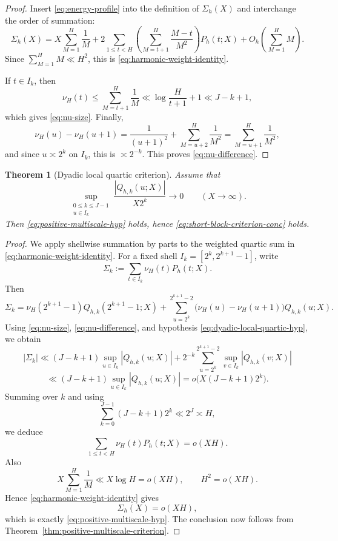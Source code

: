\documentclass[11pt]{scrartcl}
\numberwithin{equation}{section}
\newtheorem{theorem}{Theorem}[section]
\theoremstyle{definition}
\newcommand{\1}{\mathbf 1}
\newcommand{\abs}[1]{\left|#1\right|}
\begin{document}
\begin{proof}
Insert \eqref{eq:energy-profile} into the definition of $\Sigma_h(X)$ and interchange the order of summation:
\[
\Sigma_h(X)
=
X\sum_{M=1}^{H}\frac1M+2\sum_{1\le t<H}\left(\sum_{M=t+1}^{H}\frac{M-t}{M^2}\right)P_h(t;X)+O_h\!\left(\sum_{M=1}^{H}M\right).
\]
Since $\sum_{M=1}^{H}M\ll H^2$, this is \eqref{eq:harmonic-weight-identity}.

If $t\in I_k$, then
\[
\nu_H(t)\le \sum_{M=t+1}^{H}\frac1M \ll \log\!\frac{H}{t+1}+1\ll J-k+1,
\]
which gives \eqref{eq:nu-size}. Finally,
\[
\nu_H(u)-\nu_H(u+1)
=
\frac1{(u+1)^2}+\sum_{M=u+2}^{H}\frac1{M^2}
=
\sum_{M=u+1}^{H}\frac1{M^2},
\]
and since $u\asymp 2^k$ on $I_k$, this is $\asymp 2^{-k}$. This proves \eqref{eq:nu-difference}.
\end{proof}

\begin{theorem}[Dyadic local quartic criterion]
\label{thm:dyadic-local-quartic-criterion}
Assume that
\begin{equation}
\label{eq:dyadic-local-quartic-hyp}
\sup_{\substack{0\le k\le J-1 \\ u\in I_k}}\frac{\abs{Q_{h,k}(u;X)}}{X2^k}\to 0
\qquad (X\to\infty).
\end{equation}
Then \eqref{eq:positive-multiscale-hyp} holds, hence \eqref{eq:short-block-criterion-conc} holds.
\end{theorem}

\begin{proof}
We apply shellwise summation by parts to the weighted quartic sum in \eqref{eq:harmonic-weight-identity}. For a fixed shell $I_k=[2^k,2^{k+1}-1]$, write
\[
\Sigma_k:=\sum_{t\in I_k}\nu_H(t)P_h(t;X).
\]
Then
\[
\Sigma_k
=
\nu_H(2^{k+1}-1)Q_{h,k}(2^{k+1}-1;X)
+
\sum_{u=2^k}^{2^{k+1}-2}\bigl(\nu_H(u)-\nu_H(u+1)\bigr)Q_{h,k}(u;X).
\]
Using \eqref{eq:nu-size}, \eqref{eq:nu-difference}, and hypothesis \eqref{eq:dyadic-local-quartic-hyp}, we obtain
\[
\abs{\Sigma_k}
\ll
(J-k+1)\sup_{u\in I_k}\abs{Q_{h,k}(u;X)}
+
2^{-k}\sum_{u=2^k}^{2^{k+1}-2}\sup_{v\in I_k}\abs{Q_{h,k}(v;X)}
\]
\[
\ll
(J-k+1)\sup_{u\in I_k}\abs{Q_{h,k}(u;X)}
=
 o\!\bigl(X(J-k+1)2^k\bigr).
\]
Summing over $k$ and using
\[
\sum_{k=0}^{J-1}(J-k+1)2^k\ll 2^J\asymp H,
\]
we deduce
\[
\sum_{1\le t<H}\nu_H(t)P_h(t;X)=o(XH).
\]
Also
\[
X\sum_{M=1}^{H}\frac1M\ll X\log H=o(XH),
\qquad
H^2=o(XH).
\]
Hence \eqref{eq:harmonic-weight-identity} gives
\[
\Sigma_h(X)=o(XH),
\]
which is exactly \eqref{eq:positive-multiscale-hyp}. The conclusion now follows from Theorem~\ref{thm:positive-multiscale-criterion}.
\end{proof}
\end{document}
